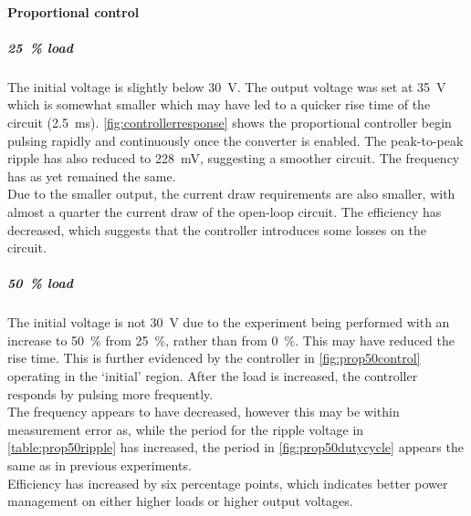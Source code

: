 \paragraph{Proportional control}
\subparagraph{\qty{25}{\percent} load}
The initial voltage is slightly below \qty{30}{\volt}.
The output voltage was set at \qty{35}{\volt} which is somewhat smaller which may have led to
a quicker rise time of the circuit (\qty{2.5}{\ms}).
\autoref{fig:controllerresponse} shows the proportional controller begin pulsing rapidly
and continuously once the converter is enabled. The peak-to-peak ripple has also reduced to
\qty{228}{\mV}, suggesting a smoother circuit. The frequency has as yet remained the same.\\
Due to the smaller output, the current draw requirements are also smaller, with almost a quarter
the current draw of the open-loop circuit. The efficiency has decreased, which suggests that the
controller introduces some losses on the circuit.
\subparagraph{\qty{50}{\percent} load}
The initial voltage is not \qty{30}{\volt} due to the experiment being performed with an
increase to \qty{50}{\percent} from \qty{25}{\percent}, rather than from \qty{0}{\percent}.
This may have reduced the rise time. This is further evidenced by the controller in \autoref{fig:prop50control}
operating in the `initial' region. After the load is increased, the controller responds by
pulsing more frequently.\\
The frequency appears to have decreased, however this may be within measurement error
as, while the period for the ripple voltage in \autoref{table:prop50ripple} has increased,
the period in \autoref{fig:prop50dutycycle} appears the same as in previous experiments.\\
Efficiency has increased by six percentage points, which indicates better power management on either
higher loads or higher output voltages.

